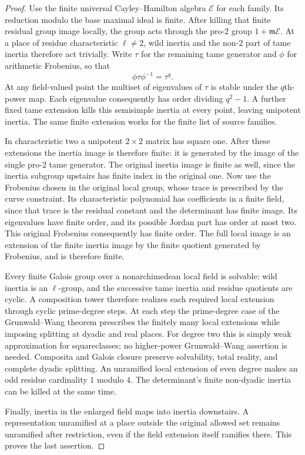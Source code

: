 \begin{proof}
Use the finite universal Cayley--Hamilton algebra $\mathscr E$ for each
family.  Its reduction modulo the base maximal ideal is finite.
After killing that finite residual group image locally, the group
acts through the pro-$2$ group $1+\mathfrak m\mathscr E$.  At a place of
residue characteristic $\ell\ne2$, wild inertia and the non-$2$
part of tame inertia therefore act trivially.  Write $\tau$ for the
remaining tame generator and $\phi$ for arithmetic Frobenius, so that
\[
\phi\tau\phi^{-1}=\tau^q.
\]
At any field-valued point the multiset of eigenvalues of $\tau$ is
stable under the $q$th-power map.  Each eigenvalue consequently has
order dividing $q^2-1$.  A further fixed tame extension kills this
semisimple inertia at every point, leaving unipotent inertia.  The
same finite extension works for the finite list of source families.

In characteristic two a unipotent $2\times2$ matrix has square one.
After these extensions the inertia image is therefore finite: it is
generated by the image of the single pro-$2$ tame generator. The
original inertia image is finite as well, since the inertia subgroup
upstairs has finite index in the original one. Now use the Frobenius
chosen in the original local group, whose trace is prescribed by the
curve constraint. Its characteristic polynomial has coefficients in a
finite field, since that trace is the residual constant and the
determinant has finite image. Its eigenvalues have finite order, and
its possible Jordan part has order at most two. This original
Frobenius consequently has finite order. The full local image is an
extension of the finite inertia image by the finite quotient generated
by Frobenius, and is therefore finite.

Every finite Galois group over a nonarchimedean local field is
solvable: wild inertia is an $\ell$-group, and the successive tame
inertia and residue quotients are cyclic.  A composition tower
therefore realizes each required local extension through cyclic
prime-degree steps.  At each step the prime-degree case of the
Grunwald--Wang theorem
\cite[Chapter~VIII, Theorem~2.4]{MilneCFT}
prescribes the finitely many local extensions while imposing
splitting at dyadic and real places.  For degree two this is simply
weak approximation for squareclasses; no higher-power
Grunwald--Wang assertion is needed.  Composita and Galois closure
preserve solvability, total reality, and complete dyadic splitting.
An unramified local extension of even degree makes an odd residue
cardinality $1$ modulo $4$.  The determinant's finite non-dyadic
inertia can be killed at the same time.

Finally, inertia in the enlarged field maps into inertia downstairs.
A representation unramified at a place outside the original allowed
set remains unramified after restriction, even if the field extension
itself ramifies there.  This proves the last assertion.
\end{proof}


